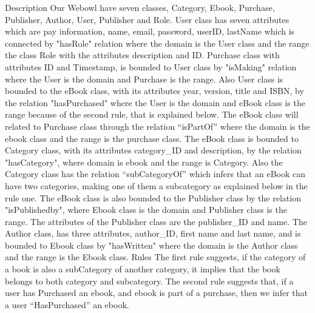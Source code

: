 Description
Our Webowl have seven classes, Category, Ebook, Purchase, Publisher, Author, User, Publisher and Role.
User class has seven attributes which are pay information, name, email, password, userID, lastName which is connected by "hasRole" relation where the domain is the User class and the range the class Role with the attributes description and ID. Purchase class with attributes ID and Timestamp, is bounded to User class by "isMaking" relation where the User is the domain and Purchase is the range. 
Also User class is bounded to the eBook class, with its attributes year, version, title and ISBN, by the relation "hasPurchased" where the User is the domain and eBook class is the range because of the second rule, that is explained below. The eBook class will related to Purchase class through the relation “isPartOf” where the domain is the ebook class and the range is the purchase class. 
The eBook class is bounded to Category class, with its attributes category_ID and description, by the relation "hasCategory", where domain is ebook and the range is Category. Also the Category class has the relation “subCategoryOf” which infers that an eBook can have two categories, making one of them a subcategory as explained below in the rule one.
The eBook class is also bounded to the Publisher class by the relation "isPublishedby", where Ebook class is the domain and Publisher class is the range. The attributes of the Publisher class are the publisher_ID and name. 
The Author class, has three attributes, author_ID, first name and last name, and is bounded to Ebook class by "hasWritten" where the domain is the Author class and the range is the Ebook class. 
Rules
The first rule suggests, if the category of a book is also a subCategory of another category, it implies that the book belongs to both category and subcategory.
The second rule suggests that, if a user has Purchased an ebook, and ebook is part of a purchase, then we infer that a user “HasPurchased” an ebook. 
